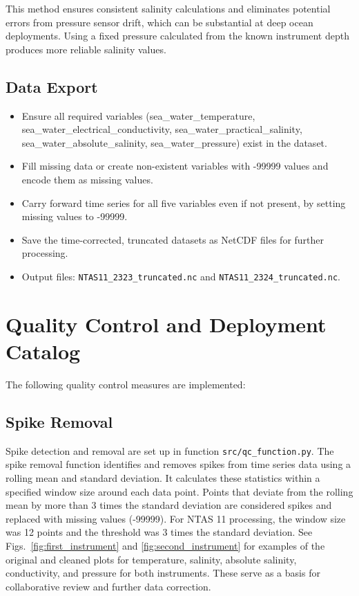\documentclass[11pt]{article}
\newcommand{\projectname}{NTAS}  %
\newcommand{\casenumber}{11}  %
\newcommand{\FirstInstrument}{2323}
\newcommand{\SecondInstrument}{2324}
\newcommand{\WindowSize}{12}  %
\newcommand{\ThresholdValue}{3}  %
\begin{document}
This method ensures consistent salinity calculations and eliminates potential errors from pressure sensor drift, 
which can be substantial at deep ocean deployments. 
Using a fixed pressure calculated from the known instrument depth produces more reliable salinity values.

\subsection{Data Export}

\begin{itemize}
\item Ensure all required variables (sea\_water\_temperature, sea\_water\_electrical\_conductivity, sea\_water\_practical\_salinity, sea\_water\_absolute\_salinity, sea\_water\_pressure) exist in the dataset.
\item Fill missing data or create non-existent variables with -99999 values and encode them as missing values.
\item Carry forward time series for all five variables even if not present, by setting missing values to -99999.
\item Save the time-corrected, truncated datasets as NetCDF files for further processing.
\item Output files: 
\texttt{\projectname\casenumber\_\FirstInstrument\_truncated.nc}
and \texttt{\projectname\casenumber\_\SecondInstrument\_truncated.nc}.
\end{itemize}


\section{Quality Control and Deployment Catalog}
The following quality control measures are implemented:

\subsection{Spike Removal}
Spike detection and removal are set up in function \texttt{src/qc\_function.py}. 
The spike removal function identifies and removes spikes from time series data using a rolling mean and standard deviation. 
It calculates these statistics within a specified window size around each data point. 
Points that deviate from the rolling mean by more than \ThresholdValue{} times the standard deviation are considered spikes and replaced with missing values (-99999). 
For \projectname{} \casenumber{} processing, the window size was \WindowSize{} points and the threshold was \ThresholdValue{} times the standard deviation.
See Figs.~\ref{fig:first_instrument} and \ref{fig:second_instrument} for examples of the original and cleaned plots for temperature, salinity, absolute salinity, conductivity, and pressure for both instruments.
These serve as a basis for collaborative review and further data correction.
\end{document}

